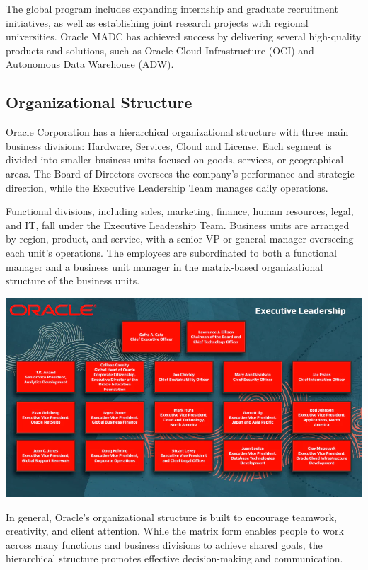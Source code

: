 \noindent
\mynewline
The global program includes expanding internship and graduate recruitment initiatives, as well as establishing joint research projects with regional universities.
Oracle MADC has achieved success by delivering several high-quality products and solutions, such as Oracle Cloud Infrastructure (OCI) and Autonomous Data Warehouse (ADW).


\subsection{Organizational Structure}
Oracle Corporation has a hierarchical organizational structure with three main business divisions: Hardware, Services, Cloud and License. Each segment is divided into smaller business units focused on goods, services, or geographical areas. The Board of Directors oversees the company's performance and strategic direction, while the Executive Leadership Team manages daily operations.\mynewline

Functional divisions, including sales, marketing, finance, human resources, legal, and IT, fall under the Executive Leadership Team. Business units are arranged by region, product, and service, with a senior VP or general manager overseeing each unit's operations. The employees are subordinated to both a functional manager and a business unit manager in the matrix-based organizational structure of the business units.\mynewline
\begin{center}
    \includegraphics[width=\linewidth]{Images/Executive Leadership Board.png}
    \label{fig:executive}
\end{center}
\noindent
\mynewline
In general, Oracle's organizational structure is built to encourage teamwork, creativity, and client attention. While the matrix form enables people to work across many functions and business divisions to achieve shared goals, the hierarchical structure promotes effective decision-making and communication.

